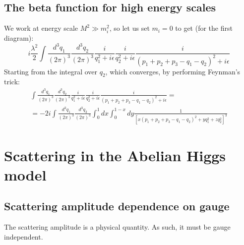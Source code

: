 \documentclass{article}
\begin{document}
\subsection{The beta function for high energy scales}
We work at energy scale $M^2 \gg m_i^2$, so let us set $m_i = 0$ to get (for the first diagram):
\begin{equation}
    i\frac{\lambda^2}{2}\int \frac{d^3q_1}{(2\pi)^3} \frac{d^3q_2}{(2\pi)^3}\frac{i}{q_1^2+i\epsilon}\frac{i}{q_2^2+i\epsilon}\frac{i}{(p_1 + p_2 + p_3 - q_1 - q_2)^2+i\epsilon}
\end{equation}
Starting from the integral over $q_2$, which converges, by performing Feynman's trick:
\begin{equation}
\begin{gathered}
    \int \frac{d^3q_1}{(2\pi)^3} \frac{d^3q_2}{(2\pi)^3}\frac{i}{q_1^2+i\epsilon}\frac{i}{q_2^2+i\epsilon}\frac{i}{(p_1 + p_2 + p_3 - q_1 - q_2)^2+i\epsilon} = \\ =
    -2i\int \frac{d^3q_1}{(2\pi)^3} \frac{d^3q_2}{(2\pi)^3}\int_0^1dx\int_0^{1-x}dy \frac{1}{[x(p_1 + p_2 + p_3 - q_1 - q_2)^2 + yq_1^2 + zq_2^2]^3}
\end{gathered}
\end{equation}
\newpage
\section{Scattering in the Abelian Higgs model}
\subsection{Scattering amplitude dependence on gauge}
The scattering amplitude is a physical quantity. As such, it must be gauge independent.
\end{document}
